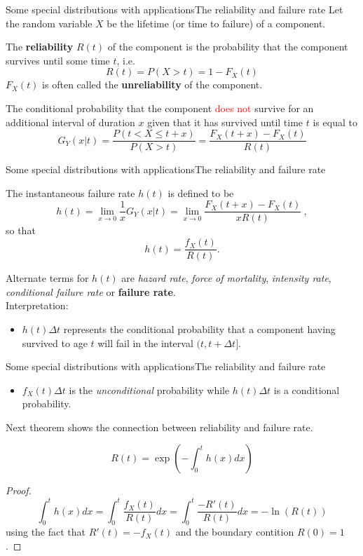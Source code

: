 \documentclass[handout]{beamer}
\begin{document}
\begin{frame}{Some special distributions with applications}{The reliability and failure rate}
Let the random variable $X$ be the lifetime (or time to failure) of a component.
\begin{definition}
 The \textbf{reliability} $R(t)$ of the component is the probability that the component survives until some time $t$, i.e. 
\[
 R(t) = P(X>t) = 1-F_X(t)
\]
$F_X(t)$ is often called the \textbf{unreliability} of the component.
\end{definition}
The conditional probability that the component  \textcolor{red}{does not} survive for an additional interval of duration $x$ 
given that it has survived until time $t$ is equal to
\[
 G_Y(x \rvert t) = \frac{P(t< X \leq t+x)}{P(X>t)} = \frac{F_X(t+x) - F_X(t)}{R(t)}
\]
\end{frame}

\begin{frame}{Some special distributions with applications}{The reliability and failure rate}
\begin{definition}
The instantaneous failure rate $h(t)$ is defined to be
\[
 h(t) = \lim_{x \rightarrow 0} \frac{1}{x} G_Y(x \rvert t) = \lim_{x \rightarrow 0} \frac{F_X(t+x) - F_X(t)}{xR(t)} \ ,
\]
so that
\[
 h(t) = \frac{f_X(t)}{R(t)}.
\]
\end{definition}
Alternate terms for $h(t)$ are \textit{hazard rate}, \textit{force of mortality}, \textit{intensity rate}, 
\textit{conditional failure rate} or \textbf{failure rate}.\\
Interpretation:
\begin{itemize}
 \item $h(t)\Delta t$ represents the conditional probability that a component having survived to age $t$ will 
fail in the interval $(t,t+\Delta t]$.
\end{itemize}
\end{frame}

\begin{frame}{Some special distributions with applications}{The reliability and failure rate}%
\begin{itemize}
 \item $f_X(t) \Delta t$ is the \textit{unconditional} probability while $h(t)\Delta t$ is a conditional probability.
\end{itemize}
Next theorem shows the connection between reliability and failure rate.
\begin{theorem}
 \[
R(t) = \exp\left( - \int_0^t h(x)dx \right)  
 \]
\end{theorem}
\begin{proof}
\[
  \int_0^t h(x)dx  =  \int_0^t \frac{f_X(t)}{R(t)}dx =\int_0^t \frac{-R'(t)}{R(t)}dx = - \ln(R(t))
\]
using the fact that $R'(t)=-f_X(t)$ and the boundary contition $R(0)=1$.
\end{proof}

\end{frame}
\end{document}
